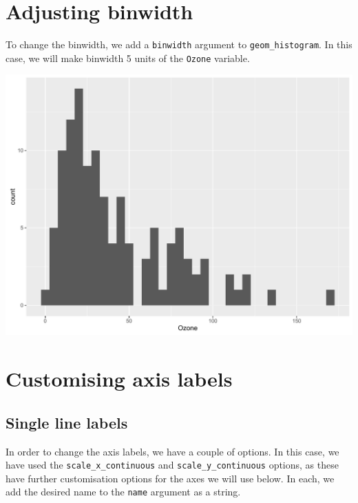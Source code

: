 \section{Adjusting binwidth}\label{adjusting-binwidth}

To change the binwidth, we add a \texttt{binwidth} argument to
\texttt{geom\_histogram}. In this case, we will make binwidth 5 units of
the \texttt{Ozone} variable.

\begin{Shaded}
\begin{Highlighting}[]
\StringTok{ }\NormalTok{(} \StringTok{ }
\StringTok{      }\NormalTok{(}\NormalTok{(}  \NormalTok{)}
\end{Highlighting}
\end{Shaded}

\begin{center}\includegraphics[width=0.55\linewidth]{figures/histogram_4-1} \end{center}

\section{Customising axis labels}\label{customising-axis-labels}

\subsection{Single line labels}\label{single-line-labels}

In order to change the axis labels, we have a couple of options. In this
case, we have used the \texttt{scale\_x\_continuous} and
\texttt{scale\_y\_continuous} options, as these have further
customisation options for the axes we will use below. In each, we add
the desired name to the \texttt{name} argument as a string.

